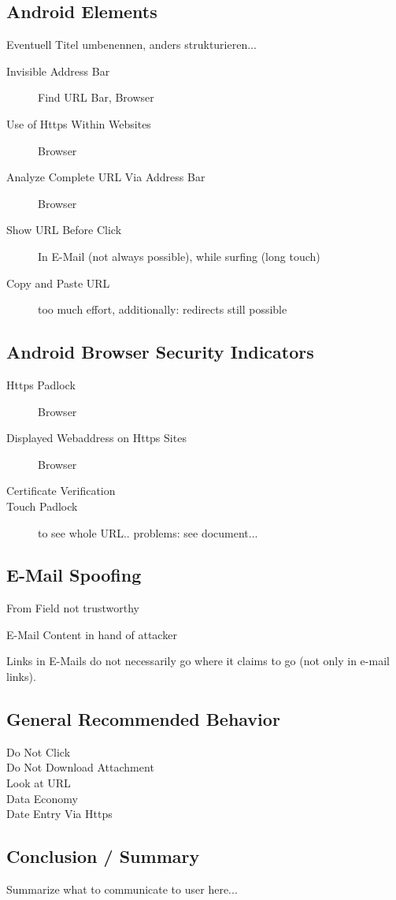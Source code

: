 \subsection{Android Elements}
Eventuell Titel umbenennen, anders strukturieren...
\begin{description}
	\item[Invisible Address Bar] Find URL Bar, Browser
	\item[Use of Https Within Websites] Browser
	\item[Analyze Complete URL Via Address Bar] Browser
	\item[Show URL Before Click] In E-Mail (not always possible), while surfing (long touch)
	\item[Copy and Paste URL] too much effort, additionally: redirects still possible
\end{description}

\subsection{Android Browser Security Indicators}

\begin{description}
		\item[Https Padlock] Browser
		\item[Displayed Webaddress on Https Sites] Browser
		\item[Certificate Verification]
		\item[Touch Padlock] to see whole URL.. problems: see document...
\end{description}

\subsection{E-Mail Spoofing}

\begin{description}
	\item{From Field} not trustworthy
	\item{E-Mail Content} in hand of attacker
	\item{Links in E-Mails} do not necessarily go where it claims to go (not only in e-mail links).
\end{description}

\subsection{General Recommended Behavior}
\begin{description}
	\item[Do Not Click]
	\item[Do Not Download Attachment]
	\item[Look at URL]
	\item[Data Economy]
	\item[Date Entry Via Https]
\end{description}

\subsection{Conclusion / Summary}

Summarize what to communicate to user here...


